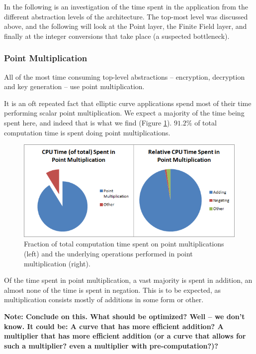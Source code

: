 In the following is an investigation of the time spent in the application from the different abstraction levels of the architecture.
The top-most level was discussed above, and the following will look at the Point layer, the Finite Field layer, and finally at the
integer conversions that take place (a suspected bottleneck).

\subsubsection{Point Multiplication}
\label{sec:performance_components_multiplication}

All of the most time consuming top-level abstractions -- encryption, decryption and key generation -- use point multiplication.

It is an oft repeated fact that elliptic curve applications spend most of their time performing scalar point multiplication. We expect a
majority of the time being spent here, and indeed that is what we find (Figure \ref{fig:point-multiplication-performance}). \(91.2\%\) of
total computation time is spent doing point multiplications.

\begin{figure}[htb]
	\centering
	\includegraphics[width=1\textwidth]{performance/point-multiplication--relative-time}
	\caption{Fraction of total computation time spent on point multiplications (left) and the underlying operations performed in point
		multiplication (right).}
	\label{fig:point-multiplication-performance}
\end{figure}

Of the time spent in point multiplication, a vast majority is spent in addition, an almost none of the time is spent in negation. This
is to be expected, as multiplication consists mostly of additions in some form or other.

\textbf{Note: Conclude on this. What should be optimized? Well -- we don't know. It could be:
A curve that has more efficient addition?
A multiplier that has more efficient addition (or a curve that allows for such a multiplier? even a multiplier with pre-computation?)?}

